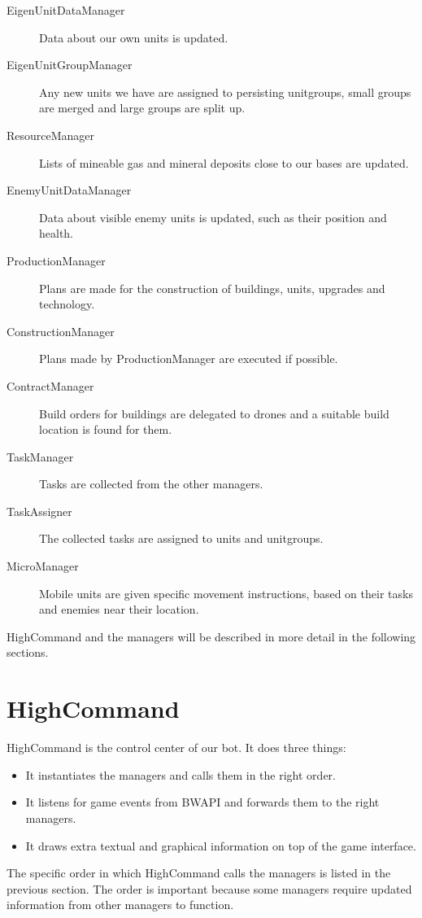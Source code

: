 \begin{description}
\item[EigenUnitDataManager] Data about our own units is updated.
\item[EigenUnitGroupManager] Any new units we have are assigned to persisting unitgroups, small groups are merged and large groups are split up.
\item[ResourceManager] Lists of mineable gas and mineral deposits close to our bases are updated.
\item[EnemyUnitDataManager] Data about visible enemy units is updated, such as their position and health.
\item[ProductionManager] Plans are made for the construction of buildings, units, upgrades and technology.
\item[ConstructionManager] Plans made by ProductionManager are executed if possible.
\item[ContractManager] Build orders for buildings are delegated to drones and a suitable build location is found for them.
\item[TaskManager] Tasks are collected from the other managers.
\item[TaskAssigner] The collected tasks are assigned to units and unitgroups.
\item[MicroManager] Mobile units are given specific movement instructions, based on their tasks and enemies near their location.
\end{description}

HighCommand and the managers will be described in more detail in the following sections.

\section{HighCommand}

HighCommand is the control center of our bot. It does three things:

\begin{itemize}
\item It instantiates the managers and calls them in the right order.
\item It listens for game events from BWAPI and forwards them to the right managers.
\item It draws extra textual and graphical information on top of the game interface.
\end{itemize}

The specific order in which HighCommand calls the managers is listed in the previous section. The order is important because some managers require updated information from other managers to function.


